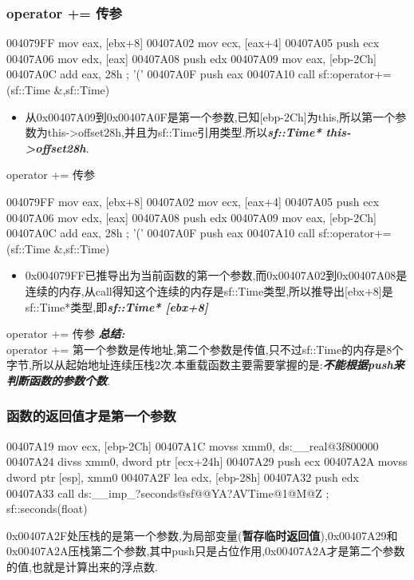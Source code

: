 \documentclass[AutoFakeBold,AutoFakeSlant]{beamer}
\begin{document}
	\begin{frame}[fragile]
		\frametitle{operator += 传参}
		\begin{x86asmcode}
004079FF  mov   eax, [ebx+8]
00407A02  mov   ecx, [eax+4]
00407A05  push  ecx
00407A06  mov   edx, [eax]
00407A08  push  edx
00407A09  mov   eax, [ebp-2Ch]
00407A0C  add   eax, 28h ; '('
00407A0F  push  eax
00407A10  call  sf::operator+=(sf::Time &,sf::Time)\end{x86asmcode}
		\begin{itemize}
		\item 从0x00407A09到0x00407A0F是第一个参数,已知[ebp-2Ch]为this,所以第一个参数为this->offset28h,并且为sf::Time引用类型.所以\textbf{\textit{sf::Time* this->offset28h}}.
	\end{itemize}
	\end{frame}
	
	\begin{frame}[fragile]{operator += 传参}
		\begin{x86asmcode}
004079FF  mov   eax, [ebx+8]
00407A02  mov   ecx, [eax+4]
00407A05  push  ecx
00407A06  mov   edx, [eax]
00407A08  push  edx
00407A09  mov   eax, [ebp-2Ch]
00407A0C  add   eax, 28h ; '('
00407A0F  push  eax
00407A10  call  sf::operator+=(sf::Time &,sf::Time)\end{x86asmcode}
		\begin{itemize}
			\item 0x004079FF已推导出为当前函数的第一个参数,而0x00407A02到0x00407A08是连续的内存,从call得知这个连续的内存是sf::Time类型,所以推导出[ebx+8]是sf::Time*类型,即\textit{\textbf{sf::Time* [ebx+8]}}
		\end{itemize}
	\end{frame}
	
	\begin{frame}[fragile]{operator += 传参}
		\textit{\textbf{总结:}} \\
		operator += 第一个参数是传地址,第二个参数是传值,只不过sf::Time的内存是8个字节,所以从起始地址连续压栈2次.本重载函数主要需要掌握的是:\textit{\textbf{不能根据push来判断函数的参数个数}}.
	\end{frame}
	
	\begin{frame}[fragile]
		\frametitle{函数的返回值才是第一个参数}
		\begin{x86asmcode}
00407A19 mov    ecx, [ebp-2Ch]
00407A1C movss  xmm0, ds:__real@3f800000
00407A24 divss  xmm0, dword ptr [ecx+24h]
00407A29 push   ecx
00407A2A movss  dword ptr [esp], xmm0
00407A2F lea    edx, [ebp-28h]
00407A32 push   edx
00407A33 call   ds:__imp_?seconds@sf@@YA?AVTime@1@M@Z ; sf::seconds(float) \end{x86asmcode}
		0x00407A2F处压栈的是第一个参数,为局部变量(\textbf{暂存临时返回值}),0x00407A29和0x00407A2A压栈第二个参数,其中push只是占位作用,0x00407A2A才是第二个参数的值,也就是计算出来的浮点数.
	\end{frame}
	
\end{document}
